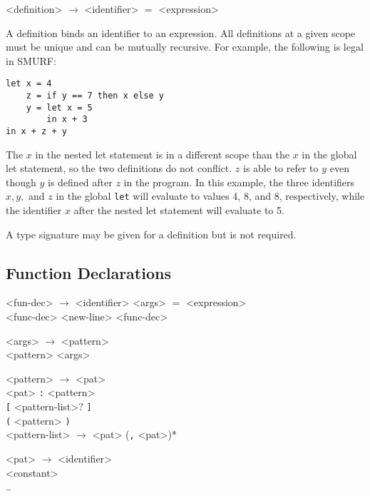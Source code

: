 \begin{grammar}

<definition> $\rightarrow$ <identifier> $=$ <expression>

\end{grammar}

A definition binds an identifier to an expression. All definitions at a given
scope must be unique and can be mutually recursive. For example, the following
is legal in SMURF:

\begin{verbatim}
let x = 4
  	z = if y == 7 then x else y
  	y = let x = 5 
        in x + 3 
in x + z + y
\end{verbatim}


The $x$ in the nested let statement is in a different scope than the $x$ in the global let statement, 
so the two definitions do not conflict. $z$ is able to refer to $y$ even though
$y$ is defined after $z$ in the program. In this example, the three 
identifiers $x, y, $ and $z$ in the global \texttt{let} will evaluate to values 4, 8, and 8, respectively,
while the identifier $x$ after the nested let statement will evaluate to 5.

A type signature may be given for a definition but is not required.

\subsection{Function Declarations}

\setlength{\grammarindent}{5em}
\begin{grammar}

<fun-dec> $\rightarrow$ <identifier> <args> $=$ <expression> \\
												 <func-dec> <new-line> <func-dec>

<args> $\rightarrow$ <pattern> \\ <pattern> <args> 


<pattern> $\rightarrow$ <pat> \\ <pat> \texttt{:} <pattern> \\ \texttt{[} <pattern-list>$?$ \texttt{]} \\
												\texttt{(} <pattern> \texttt{)} \\


<pattern-list> $\rightarrow$ <pat> (\texttt{,} <pat>)* 

<pat> $\rightarrow$ <identifier> \\ <constant> \\ \texttt{_}
												
\end{grammar}

